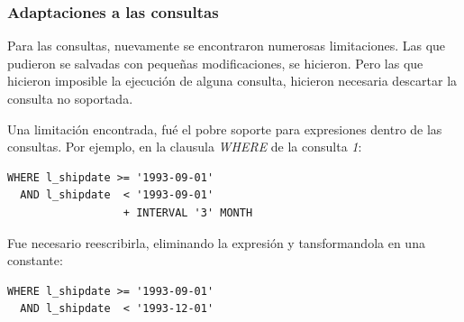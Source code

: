 \documentclass[11pt, twocolumns]{article}
\begin{document}
\begin{multicols}{2}
\subsubsection{Adaptaciones a las consultas}
Para las consultas, nuevamente se encontraron numerosas limitaciones. Las que pudieron se salvadas con pequeñas modificaciones, se hicieron. Pero las que hicieron imposible la ejecución de alguna consulta, hicieron necesaria descartar la consulta no soportada.
\par
Una limitación encontrada, fué el pobre soporte para expresiones dentro de las consultas. Por ejemplo, en la clausula \textit{WHERE} de la consulta \textit{1}:
\begin{verbatim}
WHERE l_shipdate >= '1993-09-01'
  AND l_shipdate  < '1993-09-01' 
                  + INTERVAL '3' MONTH  
\end{verbatim}
Fue necesario reescribirla, eliminando la expresión y tansformandola en una constante:
\begin{verbatim}
WHERE l_shipdate >= '1993-09-01'
  AND l_shipdate  < '1993-12-01'  
  

\end{verbatim}
\end{multicols}
\end{document}
